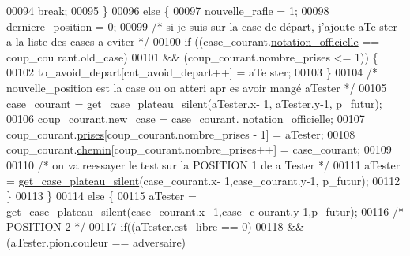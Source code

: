\begin{DoxyCode}
00094                                 \textcolor{keywordflow}{break};
00095                         \}
00096                         \textcolor{keywordflow}{else} \{
00097                                 nouvelle\_rafle = 1;
00098                                 derniere\_position = 0;
00099                                 \textcolor{comment}{/* si je suis sur la case de départ, j'ajoute aTe
      ster a la liste des cases a eviter */}
00100                                 \textcolor{keywordflow}{if} ((case\_courant.\hyperlink{structcase__plateau_ad510581b324604a9cf685cbb769a421a}{notation_officielle} == coup\_cou
      rant.old\_case)
00101                                                 && (coup\_courant.nombre\_prises <=
       1)) \{
00102                                         to\_avoid\_depart[cnt\_avoid\_depart++] = aTe
      ster;
00103                                 \}
00104                                 \textcolor{comment}{/* nouvelle\_position est la case ou on atteri apr
      es avoir mangé aTester */}
00105                                 case\_courant = \hyperlink{plateau_8h_a60a8f706865d0ae9087f8d65d4667655}{get_case_plateau_silent}(aTester.x-
      1, aTester.y-1, p\_futur);
00106                                 coup\_courant.new\_case = case\_courant.
      \hyperlink{structcase__plateau_ad510581b324604a9cf685cbb769a421a}{notation_officielle};
00107                                 coup\_courant.\hyperlink{structcoup_ae19b3a66d3f4e66b8f69a38e4005f44a}{prises}[coup\_courant.nombre\_prises - 
      1] = aTester;
00108                                 coup\_courant.\hyperlink{structcoup_aa66b88eb8140c2f459ac92fad0796510}{chemin}[coup\_courant.nombre\_prises++]
       = case\_courant;
00109 
00110                                 \textcolor{comment}{/* on va reessayer le test sur la POSITION 1 de a
      Tester */}
00111                                 aTester = \hyperlink{plateau_8h_a60a8f706865d0ae9087f8d65d4667655}{get_case_plateau_silent}(case\_courant.x-
      1,case\_courant.y-1, p\_futur);
00112                         \}
00113                 \}
00114                 \textcolor{keywordflow}{else} \{
00115                         aTester = \hyperlink{plateau_8h_a60a8f706865d0ae9087f8d65d4667655}{get_case_plateau_silent}(case\_courant.x+1,case\_c
      ourant.y-1,p\_futur);
00116                         \textcolor{comment}{/* POSITION 2 */}
00117                         \textcolor{keywordflow}{if}((aTester.\hyperlink{structcase__plateau_a173f25d2fd7c653d77ca8174ba4f636d}{est_libre} == 0)
00118                                         && (aTester.pion.couleur == adversaire)

\end{DoxyCode}
